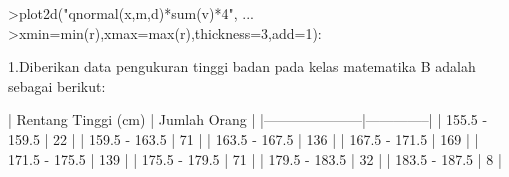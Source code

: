 \documentclass[a4paper,10pt]{article}
\begin{document}
\begin{eulernotebook}
\begin{eulercomment}
\begin{eulercomment}
\begin{eulercomment}
\begin{eulercomment}
\begin{eulercomment}
\begin{eulercomment}
\begin{eulercomment}
\end{eulercomment}
\begin{eulerprompt}
>plot2d("qnormal(x,m,d)*sum(v)*4", ...
>xmin=min(r),xmax=max(r),thickness=3,add=1):
\end{eulerprompt}
\begin{eulercomment}
\begin{eulercomment}
\begin{eulercomment}
1.Diberikan data pengukuran tinggi badan pada kelas matematika B
adalah sebagai berikut:

\end{eulercomment}
\begin{eulerttcomment}
           | Rentang Tinggi (cm) | Jumlah Orang |
           |---------------------|--------------|
           | 155.5 - 159.5       |      22      |
           | 159.5 - 163.5       |      71      |
           | 163.5 - 167.5       |     136      |
           | 167.5 - 171.5       |     169      |
           | 171.5 - 175.5       |     139      |
           | 175.5 - 179.5       |      71      |
           | 179.5 - 183.5       |      32      |
           | 183.5 - 187.5       |       8      |
\end{eulerttcomment}
\begin{eulercomment}


\end{eulercomment}
\end{eulercomment}
\end{eulercomment}
\end{eulercomment}
\end{eulercomment}
\end{eulercomment}
\end{eulercomment}
\end{eulercomment}
\end{eulercomment}
\end{eulernotebook}
\end{document}
